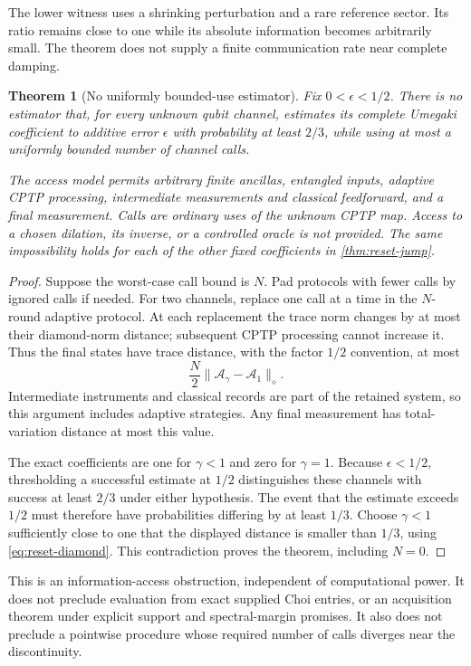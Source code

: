 \documentclass[11pt]{article}
\numberwithin{equation}{section}
\newtheorem{theorem}{Theorem}[section]
\theoremstyle{definition}
\theoremstyle{remark}
\newcommand{\norm}[1]{\lVert #1\rVert}
\begin{document}
The lower witness uses a shrinking perturbation and a rare reference sector.
Its ratio remains close to one while its absolute information becomes
arbitrarily small. The theorem does not supply a finite communication rate
near complete damping.

\begin{theorem}[No uniformly bounded-use estimator]
\label{thm:no-uniform-estimator}
Fix $0<\epsilon<1/2$. There is no estimator that, for every unknown
qubit channel, estimates its complete Umegaki coefficient to additive
error $\epsilon$ with probability at least $2/3$, while using at most
a uniformly bounded number of channel calls.

The access model permits arbitrary finite ancillas, entangled inputs,
adaptive CPTP processing, intermediate measurements and classical
feedforward, and a final measurement. Calls are ordinary uses of the
unknown CPTP map. Access to a chosen dilation, its inverse, or a
controlled oracle is not provided.
The same impossibility holds for each of the other fixed coefficients
in \cref{thm:reset-jump}.
\end{theorem}
\begin{proof}
Suppose the worst-case call bound is $N$. Pad protocols with fewer
calls by ignored calls if needed. For two channels, replace one call
at a time in the $N$-round adaptive protocol. At each replacement
the trace norm changes by at most their diamond-norm distance;
subsequent CPTP processing cannot increase it. Thus the final
states have trace distance, with the factor $1/2$ convention, at most
\[
 \frac N2\norm{\mathcal A_\gamma-\mathcal A_1}_\diamond .
\]
Intermediate instruments and classical records are part of the
retained system, so this argument includes adaptive strategies.
Any final measurement has total-variation distance at most this value.

The exact coefficients are one for $\gamma<1$ and zero for $\gamma=1$.
Because $\epsilon<1/2$, thresholding a successful estimate at $1/2$
distinguishes these channels with success at least $2/3$ under either
hypothesis. The event that the estimate exceeds $1/2$ must therefore
have probabilities differing by at least $1/3$.
Choose $\gamma<1$ sufficiently close to one that the displayed
distance is smaller than $1/3$, using \eqref{eq:reset-diamond}.
This contradiction proves the theorem, including $N=0$.
\end{proof}

This is an information-access obstruction, independent of computational
power. It does not preclude evaluation from exact supplied Choi entries,
or an acquisition theorem under explicit support and spectral-margin
promises. It also does not preclude a pointwise procedure whose required
number of calls diverges near the discontinuity.
\end{document}
